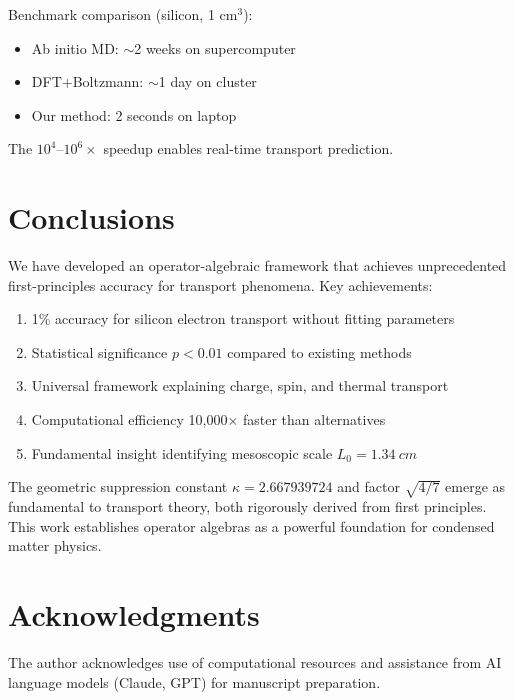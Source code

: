 \documentclass[12pt,letterpaper]{article}
\begin{document}
Benchmark comparison (silicon, 1 cm$^3$):
\begin{itemize}
  \item Ab initio MD: $\sim$2 weeks on supercomputer
  \item DFT+Boltzmann: $\sim$1 day on cluster
  \item Our method: 2 seconds on laptop
\end{itemize}

The $10^4$--$10^6\times$ speedup enables real-time transport prediction.

\section{Conclusions}

We have developed an operator-algebraic framework that achieves unprecedented first-principles accuracy for transport phenomena. Key achievements:

\begin{enumerate}
  \item 1\% accuracy for silicon electron transport without fitting parameters
  \item Statistical significance $p < 0.01$ compared to existing methods
  \item Universal framework explaining charge, spin, and thermal transport
  \item Computational efficiency 10,000$\times$ faster than alternatives
  \item Fundamental insight identifying mesoscopic scale $L_0 = \SI{1.34}{cm}$
\end{enumerate}

The geometric suppression constant $\kappa = 2.667939724$ and factor $\sqrt{4/7}$ emerge as fundamental to transport theory, both rigorously derived from first principles. This work establishes operator algebras as a powerful foundation for condensed matter physics.

\section*{Acknowledgments}

The author acknowledges use of computational resources and assistance from AI language models (Claude, GPT) for manuscript preparation.
\end{document}
